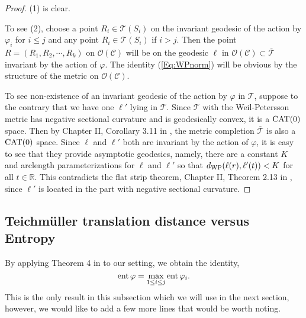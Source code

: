 \documentclass[11pt,reqno]{amsart}
\numberwithin{equation}{section}
\begin{document}
\begin{proof}  
(1)  is clear.  

To see (2), 
choose a point  $R_i  \in \mathcal{T}(S_i)$  on the invariant geodesic of the 
action by  $\varphi_i$  for  $i \leq j$  and any point   $R_i \in \mathcal{T}(S_i)$  if  
$i > j$.  
Then the point  $R = (R_1, R_2, \cdots, R_k)$  on  $\mathcal{O}(\mathcal{C})$  will be 
on the geodesic  $\ell$  in  $\mathcal{O}(\mathcal{C}) \subset \overline{\mathcal{T}}$  
invariant by the action of  $\varphi$.   
The identity (\ref{Eq:WPnorm})  will be obvious by the structure of the metric 
on  $\mathcal{O}(\mathcal{C})$.  

To see non-existence of an invariant geodesic of the action by  $\varphi$  in $\mathcal{T}$,  
suppose to the contrary that we have one  $\ell'$  lying in  $\mathcal{T}$.  
Since  $\mathcal{T}$  with the Weil-Petersson metric has negative sectional 
curvature and is geodesically convex, 
it is a  ${\rm CAT}(0)$ space.  
Then by Chapter II, Corollary 3.11 in \cite{BH}, 
the metric completion  $\overline{\mathcal{T}}$  is also 
a ${\rm CAT}(0)$ space.  
Since  $\ell$  and  $\ell'$  both are invariant by the action of  $\varphi$, 
it is easy to see that they provide asymptotic geodesics, 
namely, 
there are a constant  $K$  and arclength parameterizations for  $\ell$  and  $\ell'$  
so that  $d_{{\rm WP}}(\ell(r), \ell'(t)) < K$  for all  $t \in \mathbb{R}$.     
This contradicts the flat strip theorem, 
Chapter II, Theorem 2.13 in \cite{BH}, 
since  $\ell'$  is located in the part with negative sectional curvature.  
\end{proof}

\subsection{Teichm\"uller translation distance versus Entropy}

By applying Theorem 4 in  \cite{AKM}  to our setting, 
we obtain the identity, 
\begin{equation}\label{Eq:EntropyIsMax}
	{\rm ent} \, \varphi = \max_{1 \leq i \leq j} {\rm ent} \, \varphi_i.  
\end{equation} 
This is the only result in this subsection which we will use in the next section, 
however, 
we would like to add a few more lines that would be worth noting.  
\end{document}
